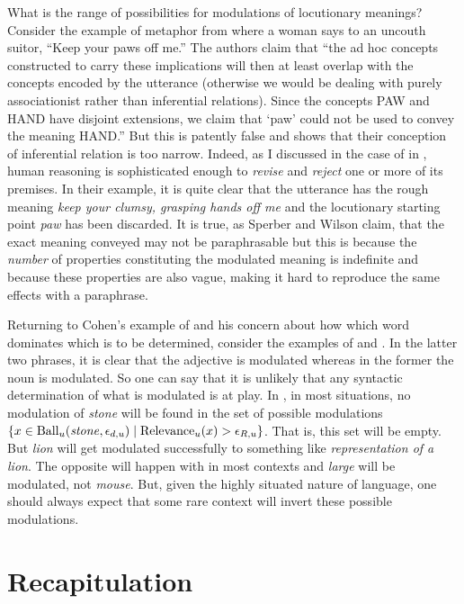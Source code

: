 What is the range of possibilities for modulations of locutionary meanings? Consider the example of metaphor from \citet[27]{sw:dam} where a woman says to an uncouth suitor, ``Keep your paws off me.'' The authors claim that ``the ad hoc concepts constructed to carry these implications will then at least overlap with the concepts encoded by the utterance (otherwise we would be dealing with purely associationist rather than inferential relations). Since the concepts PAW and HAND have disjoint extensions, we claim that `paw' could not be used to convey the meaning HAND.'' But this is patently false and shows that their conception of inferential relation is too narrow. Indeed, as I discussed in the case of  in , human reasoning is sophisticated enough to \emph{revise} and \emph{reject} one or more of its premises. In their example, it is quite clear that the utterance has the rough meaning \emph{keep your clumsy, grasping hands off me} and the locutionary starting point \emph{paw} has been discarded. It is true, as Sperber and Wilson claim, that the exact meaning conveyed may not be paraphrasable but this is because the \emph{number} of properties constituting the modulated meaning is indefinite and because these properties are also vague, making it hard to reproduce the same effects with a paraphrase.

Returning to Cohen's example of  and his concern about how which word dominates which is to be determined, consider the examples of  and . In the latter two phrases, it is clear that the adjective is modulated whereas in the former the noun is modulated. So one can say that it is unlikely that any syntactic determination of what is modulated is at play. In , in most situations, no modulation of \emph{stone} will be found in the set of possible modulations $\{ x \in \hbox{Ball}_u(\hbox{\emph{stone}}, \epsilon_{d,u}) \mid  \hbox{Relevance}_u(x) > \epsilon_{R,u} \}$. That is, this set will be empty. But \emph{lion} will get modulated successfully to something like \emph{representation of a lion}. The opposite will happen with  in most contexts and \emph{large} will be modulated, not \emph{mouse}. But, given the highly situated nature of language, one should always expect that some rare context will invert these possible modulations.

\section{Recapitulation}

